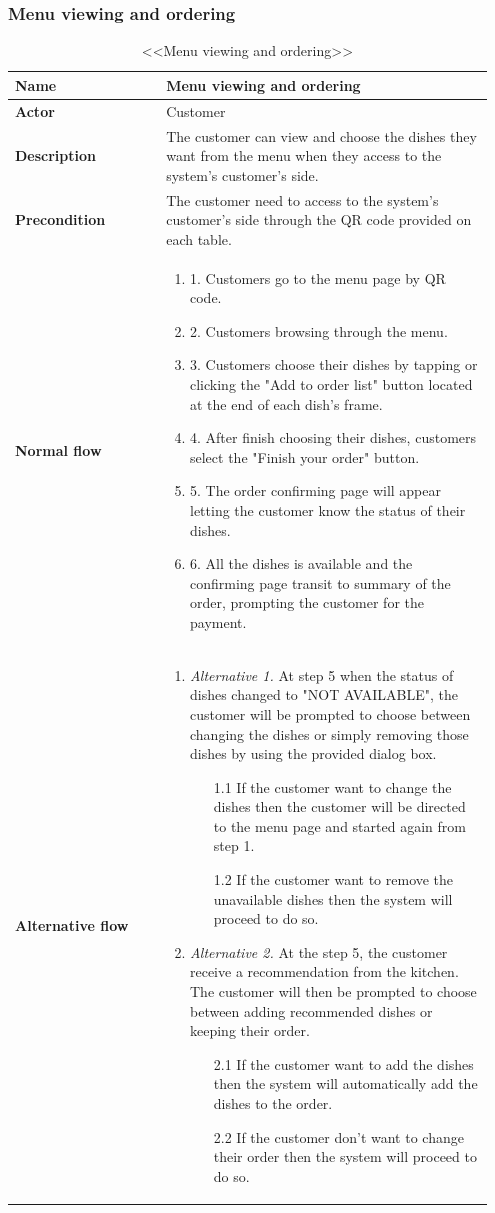 \documentclass[a4paper,11pt]{extarticle}
\newcommand\tabularhead[2]{
\begin{table}[htbp]
  \caption{<<#1>>}
  \begin{tabular}{|p{0.3\linewidth}|p{0.65\linewidth}|}
    \hline 
    \textbf{Name} & #1 \\
    \hline
    \textbf{Actor} & #2 \\
    \hline}
\newcommand\addrow[2]{\textbf{#1} &#2\\ \hline}
\newcommand\addmulrow[2]{ \begin{minipage}[t][][t]{\linewidth}\textbf{#1}\end{minipage}%
     &\begin{minipage}[t][][t]{\linewidth}
      \begin{enumerate}[wide=0pt] #2   \end{enumerate}
      \smallskip
      \end{minipage} \\ 
      \hline }
\newenvironment{usecase}{\tabularhead}
{\hline\end{tabular}\end{table}}
\begin{document}
\subsubsection{Menu viewing and ordering}
\begin{usecase}{Menu viewing and ordering}{Customer}
    \addrow{Description}{The customer can view and choose the dishes they want from the menu when they access to the system's customer's side.}
    \addrow{Precondition}{The customer need to access to the system's customer's side through the QR code provided on each table.}
    \addmulrow{Normal flow}{
        \item[1.] Customers go to the menu page by QR code.
        \item[2.] Customers browsing through the menu.
        \item[3.] Customers choose their dishes by tapping or clicking the "Add to order list" button located at the end of each dish's frame.
        \item[4.] After finish choosing their dishes, customers select the "Finish your order" button.
        \item[5.] The order confirming page will appear letting the customer know the status of their dishes.
        \item[6.] All the dishes is available and the confirming page transit to summary of the order, prompting the customer for the payment.}
    \addmulrow{Alternative flow}{
        \item[\emph{Alternative 1.}] At step 5 when the status of dishes changed to "NOT AVAILABLE", the customer will be prompted to choose between changing the dishes or simply removing those dishes by using the provided dialog box.
        \begin{enumerate}[]
            \item[1.1] If the customer want to change the dishes then the customer will be directed to the menu page and started again from step 1.
            \item[1.2] If the customer want to remove the unavailable dishes then the system will proceed to do so.
        \end{enumerate}
        \item[\emph{Alternative 2.}] At the step 5, the customer receive a recommendation from the kitchen. The customer will then be prompted to choose between adding recommended dishes or keeping their order.
        \begin{enumerate}
            \item[2.1] If the customer want to add the dishes then the system will automatically add the dishes to the order.
            \item[2.2] If the customer don't want to change their order then the system will proceed to do so.
        \end{enumerate}
        }
\end{usecase}
\end{document}
